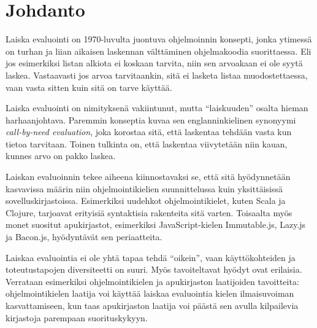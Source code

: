 
\section{Johdanto}

Laiska evaluointi on 1970-luvulta juontuva ohjelmoinnin konsepti, jonka ytimessä on turhan ja liian aikaisen laskennan välttäminen ohjelmakoodia suorittaessa. Eli jos esimerkiksi listan alkiota ei koskaan tarvita, niin sen arvoakaan ei ole syytä laskea. Vastaavasti jos arvoa tarvitaankin, sitä ei lasketa listaa muodostettaessa, vaan vasta sitten kuin sitä on tarve käyttää.

Laiska evaluointi on nimityksenä vakiintunut, mutta ``laiskuuden'' osalta hieman harhaanjohtava. Paremmin konseptia kuvaa sen englanninkielinen synonyymi \textit{call-by-need evaluation}, joka korostaa sitä, että laskentaa tehdään vasta kun tietoa tarvitaan. Toinen tulkinta on, että laskentaa viivytetään niin kauan, kunnes arvo on pakko laskea.

Laiskan evaluoinnin tekee aiheena kiinnostavaksi se, että sitä hyödynnetään kasvavissa määrin niin ohjelmointikielien suunnittelussa kuin yksittäisissä sovelluskirjastoissa. Esimerkiksi uudehkot ohjelmointikielet, kuten Scala ja Clojure, tarjoavat erityisiä syntaktisia rakenteita sitä varten. Toisaalta myös monet suositut apukirjastot, esimerkiksi JavaScript-kielen Immutable.js, Lazy.js ja Bacon.js, hyödyntävät sen periaatteita.

Laiskaa evaluointia ei ole yhtä tapaa tehdä ``oikein'', vaan käyttökohteiden ja toteutustapojen diversiteetti on suuri. Myös tavoiteltavat hyödyt ovat erilaisia. Verrataan esimerkiksi ohjelmointikielen ja apukirjaston laatijoiden tavoitteita: ohjelmointikielen laatija voi käyttää laiskaa evaluointia kielen ilmaisuvoiman kasvattamiseen, kun taas apukirjaston laatija voi päästä sen avulla kilpailevia kirjastoja parempaan suorituskykyyn.

